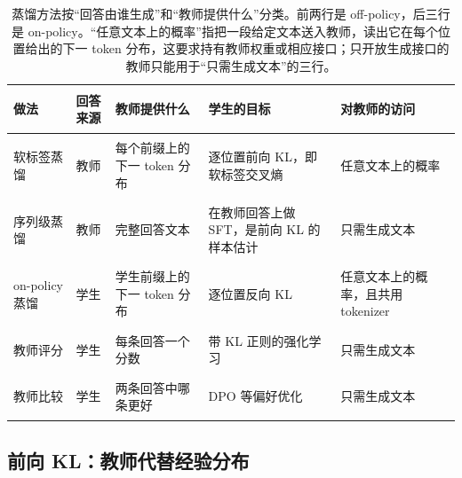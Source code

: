 \begin{table}[H]
\centering\small
\begin{tabularx}{\textwidth}{>{\bfseries\raggedright\arraybackslash}p{25mm} >{\raggedright\arraybackslash}p{18mm} X X >{\raggedright\arraybackslash}p{25mm}}
\toprule
做法 & 回答来源 & 教师提供什么 & 学生的目标 & 对教师的访问\\
\midrule
软标签蒸馏 & 教师 &每个前缀上的下一 \mbox{token} 分布 & 逐位置前向 KL，即软标签交叉熵 & 任意文本上的概率\\
序列级蒸馏 & 教师 & 完整回答文本 & 在教师回答上做 SFT，是前向 KL 的样本估计 & 只需生成文本\\
on-policy 蒸馏 & 学生 & 学生前缀上的下一 \mbox{token} 分布 & 逐位置反向 KL & 任意文本上的概率，且共用 tokenizer\\
教师评分 & 学生 & 每条回答一个分数 & 带 KL 正则的强化学习 & 只需生成文本\\
教师比较 & 学生 & 两条回答中哪条更好 & DPO 等偏好优化 & 只需生成文本\\
\bottomrule
\end{tabularx}
\caption{蒸馏方法按“回答由谁生成”和“教师提供什么”分类。前两行是 off-policy，后三行是 on-policy。“任意文本上的概率”指把一段给定文本送入教师，读出它在每个位置给出的下一 token 分布，这要求持有教师权重或相应接口；只开放生成接口的教师只能用于“只需生成文本”的三行。}
\label{tab:distillation-map}
\end{table}

\subsection{前向 KL：教师代替经验分布}

